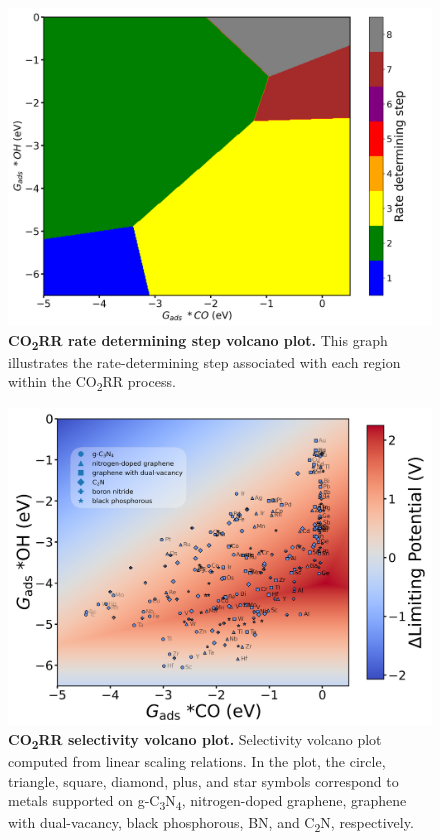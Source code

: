 \documentclass[a4paper, 12pt]{article}
\begin{document}
\begin{figure}[htbp]
  \centering
  \includegraphics[width=\textwidth]{supp_fig11_rds_volcano.png}
  \caption{\textbf{CO\textsubscript{2}RR rate determining step volcano plot.}
  This graph illustrates the rate-determining step associated with each region within the CO\textsubscript{2}RR process.}
  \label{supp_fig11:rds_volcano}
\end{figure}

\begin{figure}[htbp]
  \centering
  \includegraphics[width=\textwidth]{supp_fig12_sel_volc.png}
  \caption{\textbf{CO\textsubscript{2}RR selectivity volcano plot.}
  Selectivity volcano plot computed from linear scaling relations.
  In the plot, the circle, triangle, square, diamond, plus, and star symbols correspond to
  metals supported on g-C\textsubscript{3}N\textsubscript{4}, nitrogen-doped graphene, graphene with dual-vacancy,
  black phosphorous, BN, and C\textsubscript{2}N, respectively.}
  \label{supp_fig12:sel_volc}
\end{figure}
\end{document}
